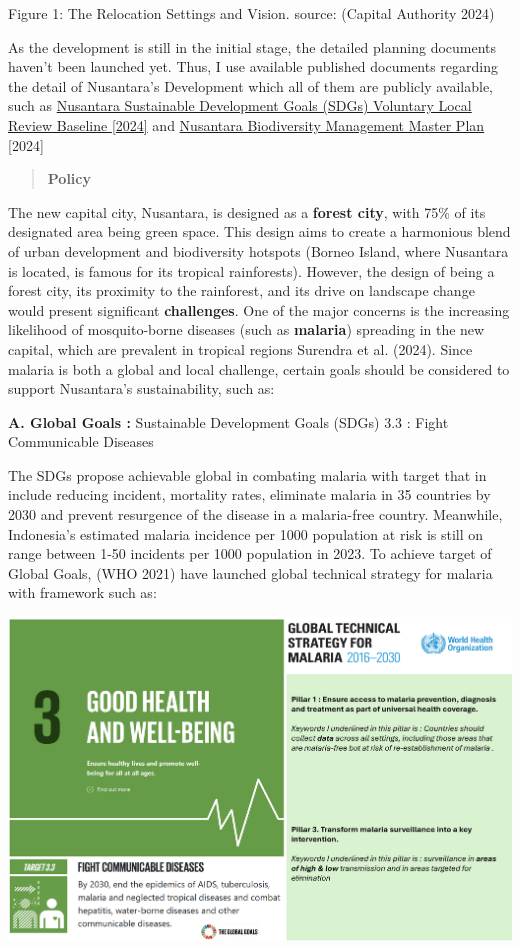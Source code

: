 \documentclass[
  letterpaper,
  DIV=11,
  numbers=noendperiod]{scrreprt}
\begin{document}
Figure 1: The Relocation Settings and Vision. source: (Capital Authority
2024)

As the development is still in the initial stage, the detailed planning
documents haven't been launched yet. Thus, I use available published
documents regarding the detail of Nusantara's Development which all of
them are publicly available, such as
\href{https://www.ikn.go.id/storage/pedoman-nusantara/2/nusantara-vlr-baseline-en.pdf}{Nusantara
Sustainable Development Goals (SDGs) Voluntary Local Review Baseline
{[}2024{]}} and
\href{https://ikn.go.id/storage/pedoman-nusantara/1/nusantara-biodiversity-management-master-plan-2024.pdf}{Nusantara
Biodiversity Management Master Plan} {[}2024{]}

\begin{quote}
\textbf{Policy}
\end{quote}

The new capital city, Nusantara, is designed as a \textbf{forest city},
with 75\% of its designated area being green space. This design aims to
create a harmonious blend of urban development and biodiversity hotspots
(Borneo Island, where Nusantara is located, is famous for its tropical
rainforests). However, the design of being a forest city, its proximity
to the rainforest, and its drive on landscape change would present
significant \textbf{challenges}. One of the major concerns is the
increasing likelihood of mosquito-borne diseases (such as
\textbf{malaria}) spreading in the new capital, which are prevalent in
tropical regions Surendra et al. (2024). Since malaria is both a global
and local challenge, certain goals should be considered to support
Nusantara's sustainability, such as:

\textbf{A. Global Goals :} Sustainable Development Goals (SDGs) 3.3 :
Fight Communicable Diseases

The SDGs propose achievable global in combating malaria with target that
in include reducing incident, mortality rates, eliminate malaria in 35
countries by 2030 and prevent resurgence of the disease in a
malaria-free country. Meanwhile, Indonesia's estimated malaria incidence
per 1000 population at risk is still on range between 1-50 incidents per
1000 population in 2023. To achieve target of Global Goals, (WHO 2021)
have launched global technical strategy for malaria with framework such
as:

\includegraphics[width=7.76042in,height=\textheight]{images/clipboard-2410472720.png}
\end{document}
